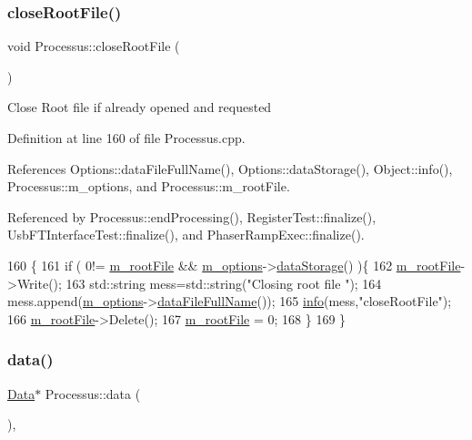 \subsubsection{\texorpdfstring{close\+Root\+File()}{closeRootFile()}}
{\footnotesize\ttfamily void Processus\+::close\+Root\+File (\begin{DoxyParamCaption}{ }\end{DoxyParamCaption})\hspace{0.3cm}{\ttfamily [inherited]}}

Close Root file if already opened and requested 

Definition at line 160 of file Processus.\+cpp.



References Options\+::data\+File\+Full\+Name(), Options\+::data\+Storage(), Object\+::info(), Processus\+::m\+\_\+options, and Processus\+::m\+\_\+root\+File.



Referenced by Processus\+::end\+Processing(), Register\+Test\+::finalize(), Usb\+F\+T\+Interface\+Test\+::finalize(), and Phaser\+Ramp\+Exec\+::finalize().


\begin{DoxyCode}
160                                 \{
161   \textcolor{keywordflow}{if} ( 0!= \hyperlink{classProcessus_a76114f8cf2111e910c323a7ae05a015d}{m\_rootFile} && \hyperlink{classProcessus_a74205f3c1e00c4448f7b3257c2351797}{m\_options}->\hyperlink{classOptions_aed7799d10139fa542055b982cb820192}{dataStorage}() )\{
162     \hyperlink{classProcessus_a76114f8cf2111e910c323a7ae05a015d}{m\_rootFile}->Write();
163         std::string mess=std::string(\textcolor{stringliteral}{"Closing root file "});
164         mess.append(\hyperlink{classProcessus_a74205f3c1e00c4448f7b3257c2351797}{m\_options}->\hyperlink{classOptions_ab1cd9f237e9c18fd72323c74565453f8}{dataFileFullName}());
165         \hyperlink{classObject_a644fd329ea4cb85f54fa6846484b84a8}{info}(mess,\textcolor{stringliteral}{"closeRootFile"});
166     \hyperlink{classProcessus_a76114f8cf2111e910c323a7ae05a015d}{m\_rootFile}->Delete();
167     \hyperlink{classProcessus_a76114f8cf2111e910c323a7ae05a015d}{m\_rootFile} = 0;
168   \}
169 \}
\end{DoxyCode}
\mbox{\label{classProcessus_a16e45f329fbce935aeef0ff3cb508228}} 
\subsubsection{\texorpdfstring{data()}{data()}\hspace{0.1cm}{\footnotesize\ttfamily [1/3]}}
{\footnotesize\ttfamily \hyperlink{classData}{Data}$\ast$ Processus\+::data (\begin{DoxyParamCaption}{ }\end{DoxyParamCaption})\hspace{0.3cm}{\ttfamily [inline]}, {\ttfamily [inherited]}}

